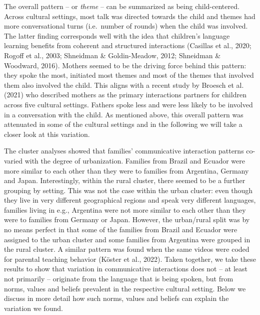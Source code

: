 \documentclass[
  man,floatsintext]{apa6}
\begin{document}
The overall pattern -- or \emph{theme} -- can be summarized as being child-centered. Across cultural settings, most talk was directed towards the child and themes had more conversational turns (i.e.~number of rounds) when the child was involved. The latter finding corresponds well with the idea that children's language learning benefits from coherent and structured interactions (Casillas et al., 2020; Rogoff et al., 2003; Shneidman \& Goldin-Meadow, 2012; Shneidman \& Woodward, 2016). Mothers seemed to be the driving force behind this pattern: they spoke the most, initiated most themes and most of the themes that involved them also involved the child. This aligns with a recent study by Broesch et al. (2021) who described mothers as the primary interactions partners for children across five cultural settings. Fathers spoke less and were less likely to be involved in a conversation with the child. As mentioned above, this overall pattern was attenuated in some of the cultural settings and in the following we will take a closer look at this variation.

The cluster analyses showed that families' communicative interaction patterns co-varied with the degree of urbanization. Families from Brazil and Ecuador were more similar to each other than they were to families from Argentina, Germany and Japan. Interestingly, within the rural cluster, there seemed to be a further grouping by setting. This was not the case within the urban cluster: even though they live in very different geographical regions and speak very different languages, families living in e.g., Argentina were not more similar to each other than they were to families from Germany or Japan. However, the urban/rural split was by no means perfect in that some of the families from Brazil and Ecuador were assigned to the urban cluster and some families from Argentina were grouped in the rural cluster. A similar pattern was found when the same videos were coded for parental teaching behavior (Köster et al., 2022). Taken together, we take these results to show that variation in communicative interactions does not -- at least not primarily -- originate from the language that is being spoken, but from norms, values and beliefs prevalent in the respective cultural setting. Below we discuss in more detail how such norms, values and beliefs can explain the variation we found.
\end{document}
